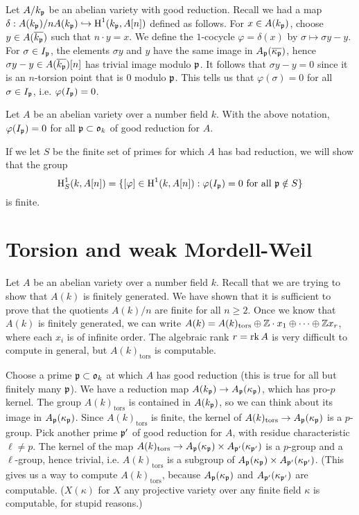 \documentclass{article}
\begin{document}
Let $A/k_{\mathfrak{p}}$ be an abelian variety with good reduction. Recall we had a map 
$\delta:A(k_{\mathfrak{p}})/n A(k_{\mathfrak{p}}) \hookrightarrow \operatorname{H}^1(k_{\mathfrak{p}},A[n])$ defined as 
follows. For $x\in A(k_{\mathfrak{p}})$, choose $y\in A(\overline{k_{\mathfrak{p}}})$ such that 
$n\cdot y=x$. We define the $1$-cocycle $\varphi=\delta(x)$ by 
$\sigma\mapsto \sigma y - y$. For $\sigma\in I_{\mathfrak{p}}$, the elements 
$\sigma y$ and $y$ have the same image in $A_{\mathfrak{p}}(\overline{\kappa_{\mathfrak{p}}})$, hence  
$\sigma y - y\in A(\overline{k_{\mathfrak{p}}})[n]$ has trivial image modulo $\mathfrak{p}$. It 
follows that $\sigma y-y=0$ since it is an $n$-torsion point that is $0$ 
modulo $\mathfrak{p}$. This tells us that $\varphi(\sigma) = 0$ for all 
$\sigma\in I_{\mathfrak{p}}$, i.e. $\varphi(I_{\mathfrak{p}}) = 0$. 

\begin{lemma}
Let $A$ be an abelian variety over a number field $k$. With the above notation, 
$\varphi(I_{\mathfrak{p}}) = 0$ for all $\mathfrak{p}\subset \mathfrak{o}_k$ of good reduction for $A$. 
\end{lemma}

If we let $S$ be the finite set of primes for which $A$ has bad reduction, we 
will show that the group
\[
  \operatorname{H}_S^1(k,A[n]) = \{[\varphi]\in \operatorname{H}^1(k,A[n]) : \varphi(I_{\mathfrak{p}}) = 0\text{ for all } \mathfrak{p}\notin S\}
\]
is finite. 










\section{Torsion and weak Mordell-Weil}

Let $A$ be an abelian variety over a number field $k$. Recall that we are 
trying to show that $A(k)$ is finitely generated. We have shown that it is 
sufficient to prove that the quotients $A(k)/n$ are finite for all 
$n\geqslant 2$. Once we know that $A(k)$ is finitely generated, we can write 
$A(k)=A(k)_\text{tors}\oplus \mathbb{Z}\cdot x_1\oplus \cdots \oplus \mathbb{Z} x_r$, where 
each $x_i$ is of infinite order. The algebraic rank $r=\operatorname{rk} A$ is 
very difficult to compute in general, but $A(k)_\text{tors}$ is computable. 

Choose a prime $\mathfrak{p}\subset \mathfrak{o}_k$ at which $A$ has good reduction (this is true 
for all but finitely many $\mathfrak{p}$). We have a reduction map 
$A(k_{\mathfrak{p}})\to A_{\mathfrak{p}}(\kappa_{\mathfrak{p}})$, which has pro-$p$ kernel. The group 
$A(k)_\text{tors}$ is contained in $A(k_{\mathfrak{p}})$, so we can think about its image 
in $A_{\mathfrak{p}}(\kappa_{\mathfrak{p}})$. Since $A(k)_\text{tors}$ is finite, the kernel of 
$A(k)_\text{tors}\to A_{\mathfrak{p}}(\kappa_{\mathfrak{p}})$ is a $p$-group. Pick another prime 
$\mathfrak{p}'$ of good reduction for $A$, with residue characteristic $\ell\ne p$. The 
kernel of the map 
$A(k)_\text{tors}\to A_{\mathfrak{p}}(\kappa_{\mathfrak{p}})\times A_{\mathfrak{p}'}(\kappa_{\mathfrak{p}'})$ is a 
$p$-group and a $\ell$-group, hence trivial, i.e. $A(k)_\text{tors}$ is a 
subgroup of $A_{\mathfrak{p}}(\kappa_{\mathfrak{p}})\times A_{\mathfrak{p}'}(\kappa_{\mathfrak{p}'})$. (This gives us a 
way to compute $A(k)_\text{tors}$, because $A_{\mathfrak{p}}(\kappa_{\mathfrak{p}})$ and 
$A_{\mathfrak{p}'}(\kappa_{\mathfrak{p}'})$ are computable. ($X(\kappa)$ for $X$ any projective 
variety over any finite field $\kappa$ is computable, for stupid reasons.)
\end{document}
